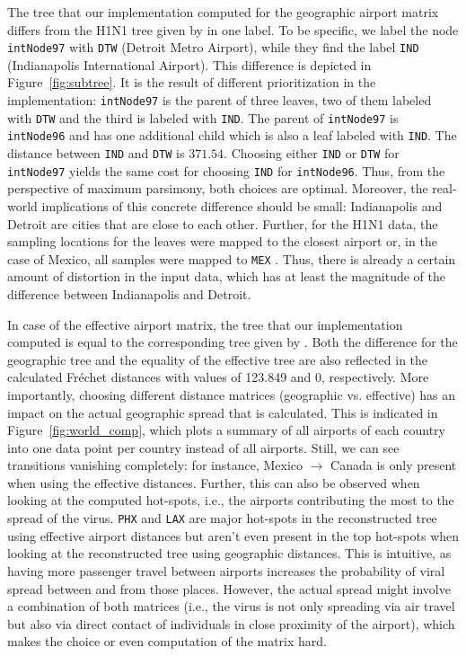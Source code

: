 \documentclass{article}
\begin{document}
The tree that our implementation computed for the geographic airport matrix
differs from the H1N1 tree given by
\cite{reimeringPhylogeographicReconstructionUsing2020} in one label. To be
specific, we label the node \texttt{intNode97} with \texttt{DTW} (Detroit Metro
Airport), while they find the label \texttt{IND} (Indianapolis International
Airport). This difference is depicted in Figure~\ref{fig:subtree}. It is the
result of different prioritization in the implementation: \texttt{intNode97} is
the parent of three leaves, two of them labeled with \texttt{DTW} and the third
is labeled with \texttt{IND}. The parent of \texttt{intNode97} is
\texttt{intNode96} and has one additional child which is also a leaf labeled
with \texttt{IND}. The distance between \texttt{IND} and \texttt{DTW} is
$371.54$. Choosing either \texttt{IND} or \texttt{DTW} for \texttt{intNode97}
yields the same cost for choosing \texttt{IND} for \texttt{intNode96}. Thus,
from the perspective of maximum parsimony, both choices are optimal. Moreover,
the real-world implications of this concrete difference should be small:
Indianapolis and Detroit are cities that are close to each other. Further, for
the H1N1 data,  the sampling locations for the leaves were mapped to the closest
airport or, in the case of Mexico, all samples were mapped to \texttt{MEX}
\cite{reimeringDistanceMatricesParsimonious2019}. Thus, there is already a
certain amount of distortion in the input data, which has at least the magnitude
of the difference between Indianapolis and Detroit.

In case of the effective airport matrix, the tree that our implementation
computed is equal to the corresponding tree given by
\cite{reimeringPhylogeographicReconstructionUsing2020}. Both the difference for
the geographic tree and the equality of the effective tree are also reflected in
the calculated Fr\'{e}chet distances with values of 123.849 and 0, respectively.
More importantly, choosing different distance matrices (geographic vs.
effective) has an impact on the actual geographic spread that is calculated.
This is indicated in Figure~\ref{fig:world_comp}, which plots a summary of all
airports of each country into one data point per country instead of all
airports. Still, we can see transitions vanishing completely: for instance,
Mexico $\rightarrow$ Canada is only present when using the effective distances.
Further, this can also be observed when looking at the computed hot-spots, i.e.,
the airports contributing the most to the spread of the virus. \texttt{PHX} and
\texttt{LAX} are major hot-spots in the reconstructed tree using effective
airport distances but aren't even present in the top hot-spots when looking at
the reconstructed tree using geographic distances. This is intuitive, as having
more passenger travel between airports increases the probability of viral spread
between and from those places. However, the actual spread might involve a
combination of both matrices (i.e., the virus is not only spreading via air
travel but also via direct contact of individuals in close proximity of the
airport), which makes the choice or even computation of the matrix hard.
\end{document}
